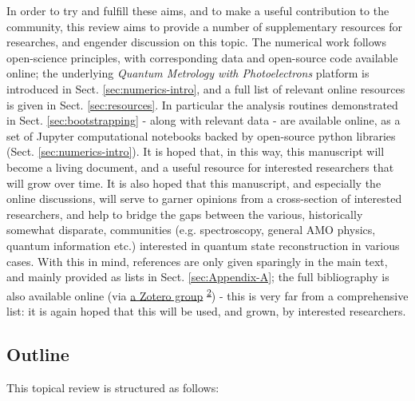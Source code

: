 \documentclass[10pt]{article}
\begin{document}
In order to try and fulfill these aims, and to make a useful contribution to the community, this review aims to provide a number of supplementary resources for researches, and engender discussion on this topic. The numerical work follows open-science principles, with corresponding data and open-source code available online; the underlying \textit{Quantum Metrology with Photoelectrons} platform is introduced in Sect. \ref{sec:numerics-intro}, and a full list of relevant online resources is given in Sect. \ref{sec:resources}.
In particular the analysis routines demonstrated in Sect. \ref{sec:bootstrapping} - along with relevant data - are available online, as a set of Jupyter computational notebooks backed by open-source python libraries (Sect. \ref{sec:numerics-intro}).
It is hoped that, in this way, this manuscript will become a living document, and a useful resource for interested researchers that will grow over time. It is also hoped that this manuscript, and especially the online discussions, will serve  to garner opinions from a cross-section of interested researchers, and help to bridge the gaps between the various, historically somewhat disparate, communities (e.g. spectroscopy, general AMO physics, quantum information etc.) interested in quantum state reconstruction in various cases. With this in mind, references are only given sparingly in the main text, and mainly provided as lists in Sect. \ref{sec:Appendix-A}; the full bibliography is also available online (via \href{https://www.zotero.org/groups/4733878/molecular_frame_pads_measurements_and_reconstruction}{a Zotero group} \textsuperscript{\hyperref[csl:2]{2}}) - this is very far from a comprehensive list: it is again hoped that this will be used, and grown, by interested researchers.

\subsection{Outline}

This topical review is structured as follows:
\end{document}
